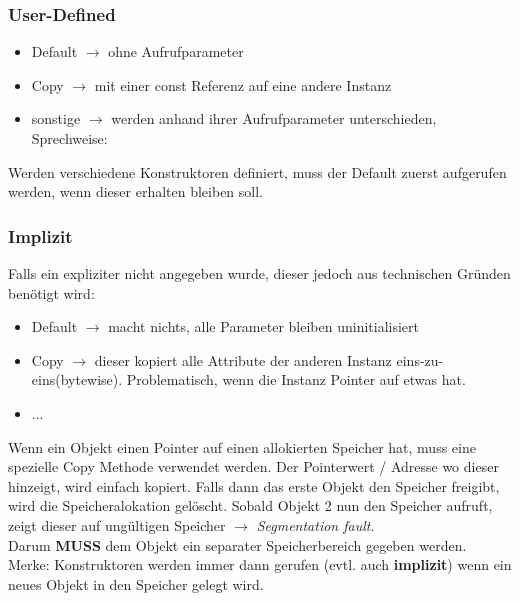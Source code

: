 \subsubsection{User-Defined}

\begin{itemize}[itemsep=1pt, parsep=0pt]
    \item Default $\rightarrow$ ohne Aufrufparameter
    \item Copy $\rightarrow$ mit einer const Referenz auf eine andere Instanz
    \item sonstige $\rightarrow$ werden anhand ihrer Aufrufparameter unterschieden, Sprechweise:
\end{itemize}

Werden verschiedene Konstruktoren definiert, muss der Default zuerst aufgerufen werden, wenn dieser erhalten bleiben soll.\\

\subsubsection{Implizit}

Falls ein expliziter nicht angegeben wurde, dieser jedoch aus technischen Gründen benötigt wird:

\begin{itemize}[itemsep=1pt, parsep=0pt]
    \item Default $\rightarrow$ macht nichts, alle Parameter bleiben uninitialisiert
    \item Copy $\rightarrow$ dieser kopiert alle Attribute der anderen Instanz eins-zu-eins(bytewise). Problematisch, wenn die Instanz Pointer auf etwas hat.
    \item ...
\end{itemize}

Wenn ein Objekt einen Pointer auf einen allokierten Speicher hat, muss eine spezielle Copy Methode verwendet werden. 
Der Pointerwert / Adresse wo dieser hinzeigt, wird einfach kopiert. 
Falls dann das erste Objekt den Speicher freigibt, wird die Speicheralokation gelöscht. 
Sobald Objekt 2 nun den Speicher aufruft, zeigt dieser auf ungültigen Speicher $\rightarrow$ \textit{Segmentation fault}.\\
Darum \textbf{MUSS} dem Objekt ein separater Speicherbereich gegeben werden.\\

Merke: Konstruktoren werden immer dann gerufen (evtl. auch \textbf{implizit}) wenn ein neues Objekt in den Speicher gelegt wird.\\

